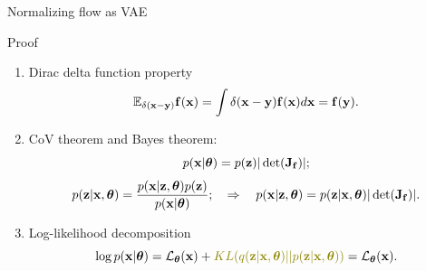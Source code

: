 \documentclass{beamer}
\begin{document}
\begin{frame}{Normalizing flow as VAE}
	\begin{block}{Proof}
		\begin{enumerate}
			\item Dirac delta function property 
			\[
				\mathbb{E}_{\delta(\mathbf{x} - \mathbf{y})} \mathbf{f}(\mathbf{x}) = \int \delta(\mathbf{x} - \mathbf{y}) \mathbf{f}(\mathbf{x}) d \mathbf{x} = \mathbf{f}(\mathbf{y}).
			\]
			\item CoV theorem and Bayes theorem:
			\[
				p(\mathbf{x} | \boldsymbol{\theta}) = p(\mathbf{z}) |\det (\mathbf{J}_{\mathbf{f}})|;
			\]
			\[
				p(\mathbf{z} | \mathbf{x}, \boldsymbol{\theta}) = \frac{p(\mathbf{x} | \mathbf{z}, \boldsymbol{\theta}) p(\mathbf{z})}{p(\mathbf{x} | \boldsymbol{\theta})}; \quad \Rightarrow \quad p(\mathbf{x} | \mathbf{z}, \boldsymbol{\theta}) = p(\mathbf{z} | \mathbf{x}, \boldsymbol{\theta}) |\det (\mathbf{J}_{\mathbf{f}})|.
			\]
			\item Log-likelihood decomposition
			\[
				\log p(\bx | \btheta) = \cL_{\btheta}(\bx) + {\color{olive}KL(q(\bz | \bx, \btheta) || p(\bz | \bx, \btheta))} = \cL_{\btheta}(\bx).
			\]
		\end{enumerate}
	\end{block}
\end{frame}
\end{document}
